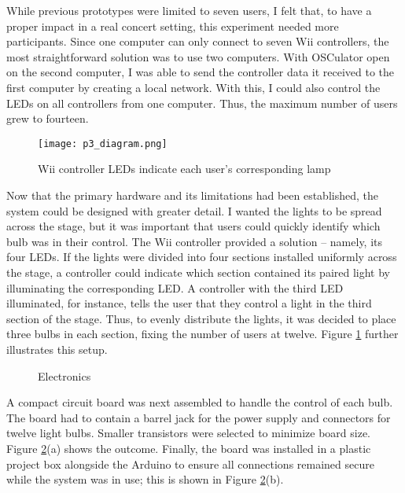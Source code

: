 While previous prototypes were limited to seven users, I felt that, to have a proper impact in a real concert setting, this experiment needed more participants. Since one computer can only connect to seven Wii controllers, the most straightforward solution was to use two computers. With OSCulator open on the second computer, I was able to send the controller data it received to the first computer by creating a local network. With this, I could also control the LEDs on all controllers from one computer. Thus, the maximum number of users grew to fourteen.

\begin{figure}
	\centering

	\texttt{[image: p3\_diagram.png]}
	\caption{Wii controller LEDs indicate each user's corresponding lamp}

	\label{prototyping3.13}
\end{figure}

Now that the primary hardware and its limitations had been established, the system could be designed with greater detail. I wanted the lights to be spread across the stage, but it was important that users could quickly identify which bulb was in their control. The Wii controller provided a solution -- namely, its four LEDs. If the lights were divided into four sections installed uniformly across the stage, a controller could indicate which section contained its paired light by illuminating the corresponding LED. A controller with the third LED illuminated, for instance, tells the user that they control a light in the third section of the stage. Thus, to evenly distribute the lights, it was decided to place three bulbs in each section, fixing the number of users at twelve. Figure \ref{prototyping3.13} further illustrates this setup.

\begin{figure}
	\centering

	\hspace{0.1cm}

	\caption{Electronics}

	\label{prototyping3.4}
\end{figure}

A compact circuit board was next assembled to handle the control of each bulb. The board had to contain a barrel jack for the power supply and connectors for twelve light bulbs. Smaller transistors were selected to minimize board size. Figure \ref{prototyping3.4}(a) shows the outcome. Finally, the board was installed in a plastic project box alongside the Arduino to ensure all connections remained secure while the system was in use; this is shown in Figure \ref{prototyping3.4}(b).

